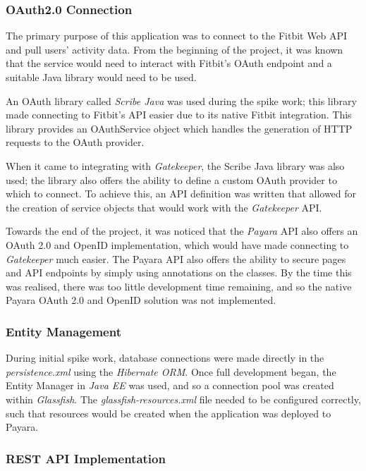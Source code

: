 \subsubsection{OAuth2.0 Connection}

The primary purpose of this application was to connect to the Fitbit Web API and pull users' activity data. From the beginning of the project, it was known that the service would need to interact with Fitbit's OAuth endpoint and a suitable Java library would need to be used.

An OAuth library called \textit{Scribe Java}\cite{ScribeJava} was used during the spike work; this library made connecting to Fitbit's API easier due to its native Fitbit integration. This library provides an OAuthService object which handles the generation of HTTP requests to the OAuth provider.

When it came to integrating with \textit{Gatekeeper}, the Scribe Java library was also used; the library also offers the ability to define a custom OAuth provider to which to connect. To achieve this, an API definition was written that allowed for the creation of service objects that would work with the \textit{Gatekeeper} API.

Towards the end of the project, it was noticed that the \textit{Payara}\cite{payara} API also offers an OAuth 2.0 and OpenID implementation, which would have made connecting to \textit{Gatekeeper} much easier. The Payara API also offers the ability to secure pages and API endpoints by simply using annotations on the classes. By the time this was realised, there was too little development time remaining, and so the native Payara OAuth 2.0 and OpenID solution was not implemented.

\subsubsection{Entity Management}

During initial spike work, database connections were made directly in the \textit{persistence.xml} using the \textit{Hibernate ORM}\cite{Hibernate}. Once full development began, the Entity Manager in \textit{Java EE} was used, and so a connection pool was created within \textit{Glassfish}\cite{glassfish}. The \textit{glassfish-resources.xml} file needed to be configured correctly, such that resources would be created when the application was deployed to Payara.

\subsubsection{REST API Implementation}

